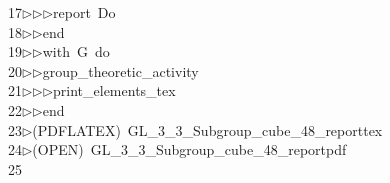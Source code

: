 \begin{tabbing}
17\>$\triangleright$\>$\triangleright$\>$\triangleright$\>report\ Do\ \\[0pt]
18\>$\triangleright$\>$\triangleright$\>end\ \\[0pt]
19\>$\triangleright$\>$\triangleright$\>with\ G\ do\ \\[0pt]
20\>$\triangleright$\>$\triangleright$\>group\_theoretic\_activity\ \\[0pt]
21\>$\triangleright$\>$\triangleright$\>$\triangleright$\>print\_elements\_tex\ \\[0pt]
22\>$\triangleright$\>$\triangleright$\>end\\[0pt]
23\>$\triangleright$\>(PDFLATEX)\ GL\_3\_3\_Subgroup\_cube\_48\_reporttex\\[0pt]
24\>$\triangleright$\>(OPEN)\ GL\_3\_3\_Subgroup\_cube\_48\_reportpdf\\[0pt]
25\>\end{tabbing}
